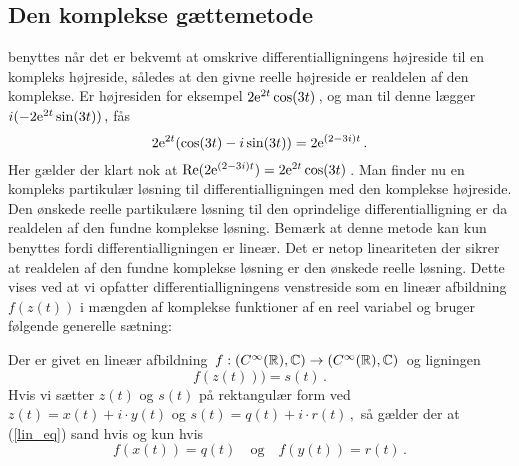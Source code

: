 \subsection{Den komplekse gættemetode} \label{af.kompleks}


 benyttes når det er bekvemt at omskrive differentialligningens højreside til en kompleks højreside, således at den givne reelle højreside er realdelen af den komplekse.\bs
Er højresiden for eksempel $2\mathrm{e}^{2t}\cos(3t)\,$, og  man til denne lægger $i(-2\mathrm{e}^{2t}\sin(3t))\,, $ fås 
\begin{equation}
2 \mathrm{e}^{2t} (\cos(3t) - i \sin(3t)) = 2 \mathrm{e}^{(2-3i)t} \,.
\end{equation}
Her gælder der klart nok at $\mathrm{Re}( 2 \mathrm{e}^{(2-3i)t})=2\mathrm{e}^{2t}\cos(3t)\,$.
Man finder nu en kompleks partikulær løsning til differentialligningen med den komplekse højreside. Den ønskede reelle partikulære løsning til den oprindelige differentialligning er da realdelen af den fundne komplekse løsning.\bs
Bemærk at denne metode kan kun benyttes fordi differentialligningen er lineær. Det er netop lineariteten der sikrer at realdelen af den fundne komplekse løsning er den ønskede reelle løsning. Dette vises ved at vi opfatter differentialligningens venstreside som en lineær afbildning $f(z(t))$ i mængden af komplekse funktioner af en reel variabel og bruger følgende generelle sætning:

\begin{theorem} \label{saet.kompl}
Der er givet en lineær afbildning $\,f: (C^{\infty}(\mathbb{R}),\mathbb{C}) \rightarrow  (C^{\infty}(\mathbb{R}),\mathbb{C})\,$ og ligningen
\begin{equation}\label{lin_eq}
f(z(t)))=s(t)\,.
\end{equation}
Hvis vi sætter $z(t)$ og $s(t)$ på rektangulær form ved $z(t)=x(t)+i\cdot y(t)$ og $s(t)=q(t)+i\cdot r(t)\,,$ så gælder der at (\ref{lin_eq}) sand hvis og kun hvis
\begin{equation} \label{lig.kompl6}
f(x(t)) = q(t) \quad \mathrm{og} \quad f(y(t)) = r(t)\,.
\end{equation}
\end{theorem}


